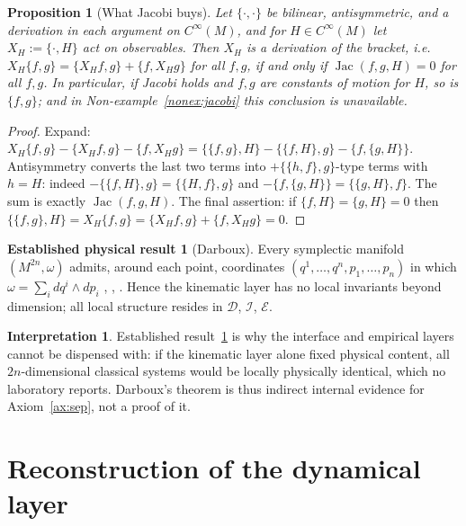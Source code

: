 \documentclass[10pt,a4paper]{article}
\theoremstyle{plain}
\newtheorem{proposition}[theorem]{Proposition}
\theoremstyle{definition}
\newtheorem{interpretation}[theorem]{Interpretation}
\newtheorem{established}[theorem]{Established physical result}
\newcommand{\Cinf}{C^{\infty}}
\newcommand{\PB}[2]{\{#1,#2\}}
\DeclareMathOperator{\Jac}{Jac}
\begin{document}
\begin{proposition}[What Jacobi buys]
\label{prop:poissonthm}
Let $\PB{\cdot}{\cdot}$ be bilinear, antisymmetric, and a derivation in each argument on $\Cinf(M)$, and for $H \in \Cinf(M)$ let $X_H := \PB{\cdot}{H}$ act on observables. Then $X_H$ is a derivation of the bracket, i.e.\ $X_H\PB{f}{g} = \PB{X_H f}{g} + \PB{f}{X_H g}$ for all $f,g$, if and only if $\Jac(f,g,H) = 0$ for all $f,g$. In particular, if Jacobi holds and $f,g$ are constants of motion for $H$, so is $\PB{f}{g}$; and in Non-example~\ref{nonex:jacobi} this conclusion is unavailable.
\end{proposition}
\begin{proof}
Expand: $X_H\PB{f}{g} - \PB{X_Hf}{g} - \PB{f}{X_Hg} = \PB{\PB{f}{g}}{H} - \PB{\PB{f}{H}}{g} - \PB{f}{\PB{g}{H}}$. Antisymmetry converts the last two terms into $+\PB{\PB{h}{f}}{g}$-type terms with $h = H$: indeed $-\PB{\PB{f}{H}}{g} = \PB{\PB{H}{f}}{g}$ and $-\PB{f}{\PB{g}{H}} = \PB{\PB{g}{H}}{f}$. The sum is exactly $\Jac(f,g,H)$. The final assertion: if $\PB{f}{H} = \PB{g}{H} = 0$ then $\PB{\PB{f}{g}}{H} = X_H\PB{f}{g} = \PB{X_Hf}{g} + \PB{f}{X_Hg} = 0$.
\end{proof}

\begin{established}[Darboux]
\label{est:darboux}
Every symplectic manifold $(M^{2n},\omega)$ admits, around each point, coordinates $(q^1,\dots,q^n,p_1,\dots,p_n)$ in which $\omega = \sum_i dq^i\wedge dp_i$ \cite[Thm.~3.2.2]{AbrahamMarsden1978}, \cite[Ch.~8]{Arnold1989}, \cite[Thm.~3.2.2]{McDuffSalamon2017}. Hence the kinematic layer has no local invariants beyond dimension; all local structure resides in $\mathcal{D}$, $\mathcal{I}$, $\mathcal{E}$.
\end{established}

\begin{interpretation}
\label{int:darboux}
Established result~\ref{est:darboux} is why the interface and empirical layers cannot be dispensed with: if the kinematic layer alone fixed physical content, all $2n$-dimensional classical systems would be locally physically identical, which no laboratory reports. Darboux's theorem is thus indirect internal evidence for Axiom~\ref{ax:sep}, not a proof of it.
\end{interpretation}

\section{Reconstruction of the dynamical layer}
\label{sec:reconstruction}
\end{document}
